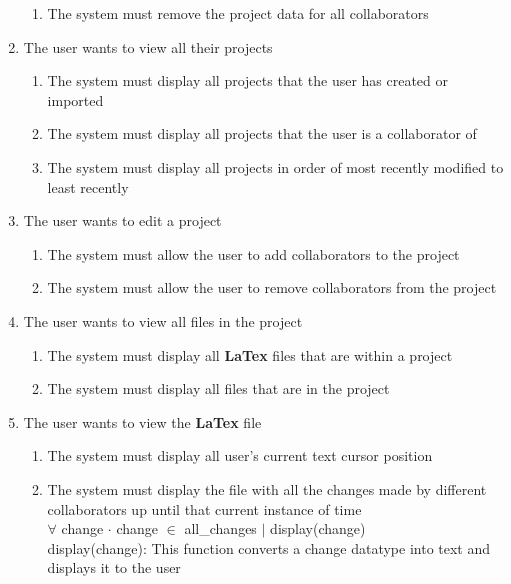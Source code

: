 \documentclass[12pt, titlepage]{article}
\begin{document}
\begin{enumerate}[{BE}1.]
\begin{enumerate}[resume*]
			\item The system must remove the project data for all collaborators
		\end{enumerate}
		\item The user wants to view all their projects
		\begin{enumerate}[resume*]
			\item The system must display all projects that the user has created or imported
			\item The system must display all projects that the user is a collaborator of
			\item The system must display all projects in order of most recently modified to least recently
		\end{enumerate}
		\item The user wants to edit a project
		\begin{enumerate}[resume*]
			\item The system must allow the user to add collaborators to the project
			\item The system must allow the user to remove collaborators from the project
		\end{enumerate}
		\item The user wants to view all files in the project
		\begin{enumerate}[resume*]
			\item The system must display all \textbf{LaTex} files that are within a project
			\item The system must display all files that are in the project
		\end{enumerate}
		\item The user wants to view the \textbf{LaTex} file
		\begin{enumerate}[resume*]
			\item The system must display all user's current text cursor position
			\item The system must display the file with all the changes made by different collaborators up until that current instance of time\\
			
			$\forall$ change $\cdot$ change $\in$ all\_changes $\vert$ display(change)\\
			
			display(change): This function converts a change datatype into text and displays it to the user\\
			

\end{enumerate}
\end{enumerate}
\end{document}

